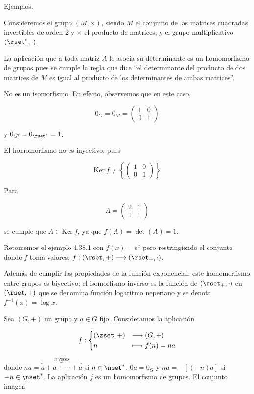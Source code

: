 Ejemplos.

Consideremos el grupo $(M, \times)$, siendo $M$ el conjunto de las matrices
cuadradas invertibles de orden $2$ y $\times$ el producto de matrices, y el
grupo multiplicativo $(\rset^*, \cdot)$.

La aplicación que a toda matriz $A$ le asocia su determinante es un
homomorfismo de grupos pues se cumple la regla que dice ``el determinante
del producto de dos matrices de $M$ es igual al producto de los
determinantes de ambas matrices''.

No es un isomorfismo. En efecto, observemos que en este caso,

$$
  0_G = 0_M =
  \begin{pmatrix}
    1 & 0 \\
    0 & 1
  \end{pmatrix}
$$

\noindent y $0_{G'} = 0_{\rset^*} = 1$.

El homomorfismo no es inyectivo, pues

$$
  \text{Ker}\ f \neq \left\{
  \begin{pmatrix}
    1 & 0 \\
    0 & 1
  \end{pmatrix}
  \right\}
$$

Para

$$
  A =
  \begin{pmatrix}
    2 & 1 \\
    1 & 1
  \end{pmatrix}
$$

\noindent se cumple que $A \in \text{Ker}\ f$, ya que $f(A) = \det(A) = 1$.

Retomemos el ejemplo 4.38.1 con $f(x) = e^x$ pero restringiendo el conjunto
donde $f$ toma valores; $f: (\rset, +) \longrightarrow (\rset_+, \cdot)$.

Además de cumplir las propiedades de la función exponencial, este
homomorfismo entre grupos es biyectivo; el isomorfismo inverso es la función
de $(\rset_+, \cdot)$ en $(\rset, +)$ que se denomina función logaritmo
neperiano y se denota $f^{-1}(x) = \log x$.

Sea $(G, +)$ un grupo y $a \in G$ fijo. Consideramos la aplicación

$$
  f:
  \begin{cases}
    (\zset, +) & \longrightarrow (G, +) \\
    n & \longmapsto f(n) = na
  \end{cases}
$$

\noindent donde $na = \overbrace{a + a + \cdots + a}^{n \ \text{veces}}$ si
$n \in \nset^*$, $0a = 0_G$ y $na = {-[({-n})a]}$ si ${-n} \in \nset^*$. La
aplicación $f$ es un homomorfismo de grupos. El conjunto imagen

